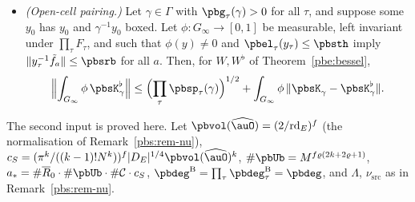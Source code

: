 \documentclass[10pt]{amsart}
\theoremstyle{definition}
\theoremstyle{remark}
\providecommand{\pbR}{\overline R_0}
\begin{document}
\begin{itemize}
\item[(O1)] \emph{(Open-cell pairing.)} Let $\gamma\in\Gamma$ with $\pbg_\tau(\gamma)>0$ for all $\tau$, and
suppose some $y_0$ has $y_0$ and $\gamma^{-1}y_0$ boxed. Let $\phi\colon G_\infty\to[0,1]$ be measurable,
left invariant under $\prod_\tau F_\tau$, and such that $\phi(y)\ne0$ and $\pbel_\tau(y_\tau)\le\pbsth$
imply $\|y_\tau^{-1}\tilde f_a\|\le\pbsrb$ for all $a$. Then, for $W,W^\flat$ of Theorem~\ref{pbe:bessel},
\[
\Bigl\|\int_{G_\infty}\phi\,\pbsK^\flat_\gamma\Bigr\|\le\Bigl(\prod_\tau\pbsp_\tau(\gamma)\Bigr)^{1/2}+\int_{
G_\infty}\phi\,\|\pbsK_\gamma-\pbsK^\flat_\gamma\| .
\]
\end{itemize}

The second input is proved here. Let $\pbvol(\widehat\auO)=(2/\mathrm{rd}_E)^f$ (the normalisation of
Remark~\ref{pbs:rem-nu}), $c_S=(\pi^k/((k-1)!N^k))^f|D_E|^{1/4}\pbvol(\widehat\auO)^k$, $\#\pbUb=M^{f
\varrho(2k+2\varrho+1)}$, $a_*=\#\pbR\cdot\#\pbUb\cdot\#\mathcal C\cdot c_S$, $\pbdeg^{\mathrm B}=\prod_\tau
\pbdeg^{\mathrm B}_\tau=\pbdeg$, and $\Lambda$, $\nu_{\mathrm{src}}$ as in Remark~\ref{pbs:rem-nu}.
\end{document}
